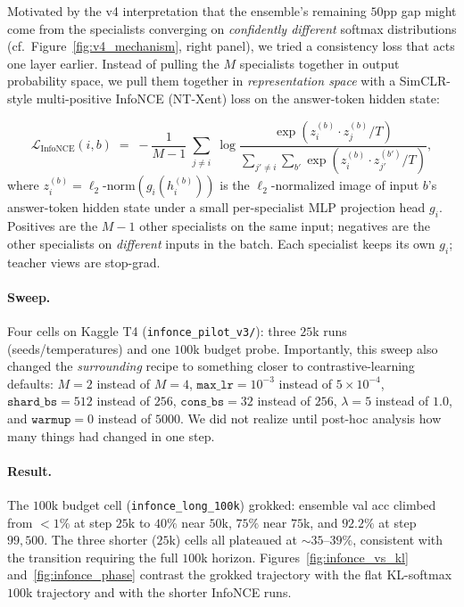 \documentclass[11pt,a4paper]{article}
\begin{document}
Motivated by the v4 interpretation that the ensemble's remaining $50$pp
gap might come from the specialists converging on \emph{confidently
different} softmax distributions (cf.\ Figure~\ref{fig:v4_mechanism},
right panel), we tried a consistency loss that acts one layer earlier.
Instead of pulling the $M$ specialists together in output probability
space, we pull them together in \emph{representation space} with a
SimCLR-style multi-positive InfoNCE (NT-Xent) loss on the answer-token
hidden state:

\[
  \mathcal{L}_{\text{InfoNCE}}(i,b)
  \;=\; -\frac{1}{M-1}\sum_{\substack{j\neq i}}
        \log \frac{\exp(z_i^{(b)} \!\cdot\! z_j^{(b)}/T)}
                  {\sum_{j'\neq i}\sum_{b'}\exp(z_i^{(b)} \!\cdot\! z_{j'}^{(b')}/T)},
\]
where $z_i^{(b)} = \ell_2\text{-norm}(g_i(h_i^{(b)}))$ is the
$\ell_2$-normalized image of input $b$'s answer-token hidden state
under a small per-specialist MLP projection head $g_i$. Positives are
the $M-1$ other specialists on the same input; negatives are the other
specialists on \emph{different} inputs in the batch. Each specialist
keeps its own $g_i$; teacher views are stop-grad.

\paragraph{Sweep.} Four cells on Kaggle T4
(\texttt{infonce\_pilot\_v3/}): three $25$k runs (seeds/temperatures)
and one $100$k budget probe. Importantly, this sweep also changed the
\emph{surrounding} recipe to something closer to contrastive-learning
defaults: $M{=}2$ instead of $M{=}4$,
$\mathtt{max\_lr}{=}10^{-3}$ instead of $5{\times}10^{-4}$,
$\mathtt{shard\_bs}{=}512$ instead of $256$,
$\mathtt{cons\_bs}{=}32$ instead of $256$,
$\lambda{=}5$ instead of $1{.}0$, and $\mathtt{warmup}{=}0$ instead of
$5000$. We did not realize until post-hoc analysis how many things had
changed in one step.

\paragraph{Result.} The $100$k budget cell (\texttt{infonce\_long\_100k})
grokked: ensemble val acc climbed from $<\!1\%$ at step $25$k to
$40\%$ near $50$k, $75\%$ near $75$k, and $\mathbf{92.2\%}$ at step
$99{,}500$. The three shorter ($25$k) cells all plateaued at
$\sim$$35$--$39\%$, consistent with the transition requiring the full
$100$k horizon. Figures~\ref{fig:infonce_vs_kl}
and~\ref{fig:infonce_phase} contrast the grokked trajectory with the
flat KL-softmax $100$k trajectory and with the shorter InfoNCE runs.
\end{document}
